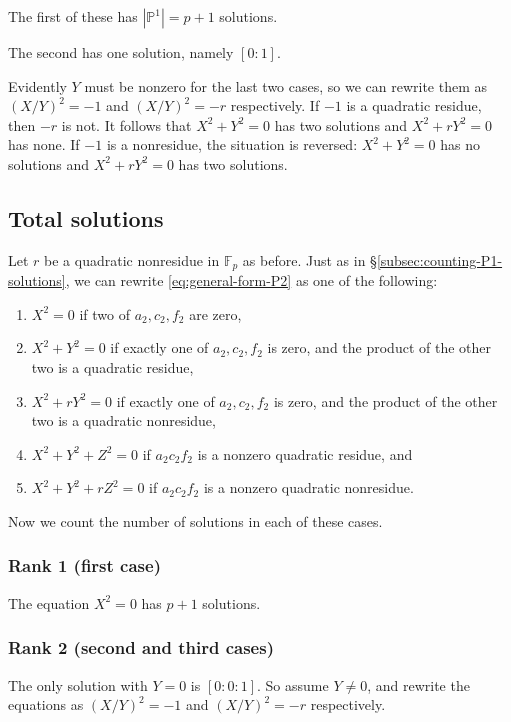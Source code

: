 \documentclass[10pt,a4paper]{amsart}
\numberwithin{equation}{section}
\numberwithin{figure}{section}
\theoremstyle{definition}
\theoremstyle{remark}
\theoremstyle{plain}
\theoremstyle{plain}
\theoremstyle{definition}
\theoremstyle{plain}
\theoremstyle{plain}
\renewcommand{\P}{\mathbb{P}}
\newcommand{\F}{\mathbb{F}}
\begin{document}
    The first of these has $|\P^1| = p+1$ solutions. 

    The second has one solution, namely $[0:1]$.

    Evidently $Y$ must be nonzero for the last two cases, so we can rewrite them as
    $(X/Y)^2 = -1$ and $(X/Y)^2 = -r$ respectively. If $-1$ is a quadratic residue,
    then $-r$ is not. It follows that $X^2 + Y^2 = 0$ has two solutions and $X^2 +
    rY^2 = 0$ has none. If $-1$ is a nonresidue, the situation is reversed: $X^2 +
    Y^2 = 0$ has no solutions and $X^2 + rY^2 = 0$ has two solutions.

    \subsection{Total solutions}
    \label{subsec:counting-P2-solutions}

    Let $r$ be a quadratic nonresidue in $\F_p$ as before. Just as in
    \S\ref{subsec:counting-P1-solutions}, we can rewrite \eqref{eq:general-form-P2}
    as one of the following: 
    \begin{enumerate} 
        \item $X^2 = 0$ if two of $a_2, c_2, f_2$ are zero, 
        \item $X^2 + Y^2 = 0$ if exactly one of $a_2, c_2, f_2$ is zero,
        and the product of the other two is a quadratic residue, 
        \item $X^2 + rY^2 = 0$ if exactly one of $a_2, c_2, f_2$ is zero, 
        and the product of the other two is a quadratic nonresidue, 
        \item $X^2 + Y^2 + Z^2 = 0$ if $a_2 c_2 f_2$ is a nonzero quadratic residue, and 
        \item $X^2 + Y^2 + rZ^2 = 0$ if $a_2 c_2 f_2$ is
        a nonzero quadratic nonresidue.  
    \end{enumerate}

    Now we count the number of solutions in each of these cases.

    \subsubsection*{Rank 1 (first case)} 
    The equation $X^2 = 0$ has $p + 1$ solutions.

    \subsubsection*{Rank 2 (second and third cases)} 
    The only solution with $Y=0$ is $[0:0:1]$. So assume $Y \neq 0$, and rewrite the 
    equations as $(X/Y)^2 = -1$ and $(X/Y)^2 = -r$ respectively.
\end{document}
